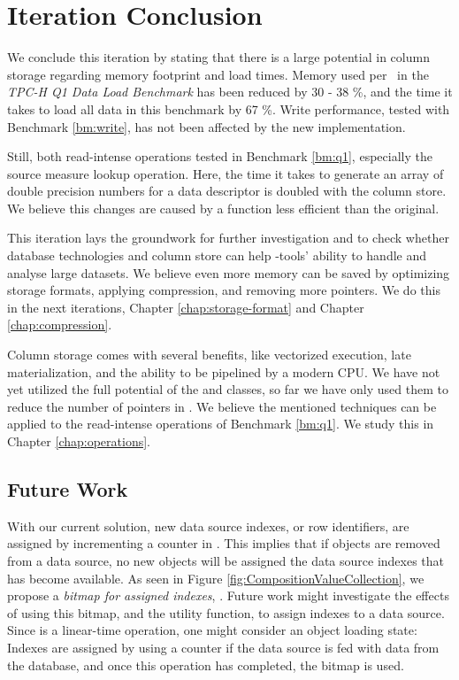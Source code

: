 \section{Iteration Conclusion}
\label{sec:Iteration Conclusion}
We conclude this iteration by stating that there is a large potential in column storage regarding memory footprint and load times. Memory used per \lineitem~in the \textit{TPC-H Q1 Data Load Benchmark} has been reduced by 30 - 38 \%, and the time it takes to load all data in this benchmark by 67 \%. Write performance, tested with Benchmark \ref{bm:write}, has not been affected by the new implementation.

Still, both read-intense operations tested in Benchmark \ref{bm:q1}, especially the source measure lookup operation. Here, the time it takes to generate an array of double precision numbers for a data descriptor is doubled with the column store. We believe this changes are caused by a  function less efficient than the original.

This iteration lays the groundwork for further investigation and to check whether database technologies and column store can help \mdd-tools' ability to handle and analyse large datasets. We believe even more memory can be saved by optimizing storage formats, applying compression, and removing more pointers. We do this in the next iterations, Chapter \ref{chap:storage-format} and Chapter \ref{chap:compression}. 

Column storage comes with several benefits, like vectorized execution, late materialization, and the ability to be pipelined by a modern CPU. We have not yet utilized the full potential of the  and  classes, so far we have only used them to reduce the number of pointers in \gap. We believe the mentioned techniques can be applied to the read-intense operations of Benchmark \ref{bm:q1}. We study this in Chapter \ref{chap:operations}.

\subsection{Future Work}
\label{sub:Future Work}
With our current solution, new data source indexes, or row identifiers, are assigned by incrementing a counter in . This implies that if objects are removed from a data source, no new objects will be assigned the data source indexes that has become available. As seen in Figure \ref{fig:CompositionValueCollection}, we propose a \textit{bitmap for assigned indexes}, . Future work might investigate the effects of using this bitmap, and the  utility function, to assign indexes to a data source. Since  is a linear-time operation, one might consider an object loading state: Indexes are assigned by using a counter if the data source is fed with data from the database, and once this operation has completed, the  bitmap is used.


